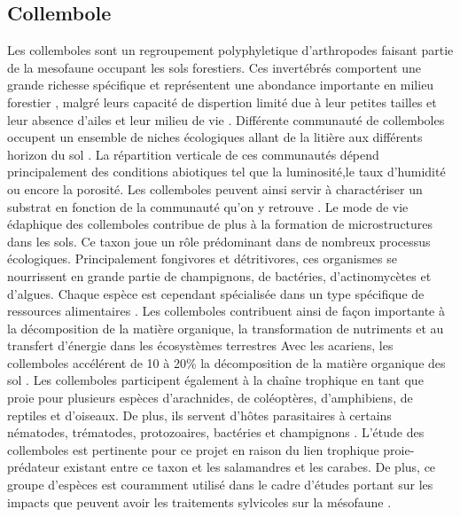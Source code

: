 \subsection*{Collembole}

Les collemboles sont un regroupement polyphyletique d'arthropodes faisant partie de la mesofaune occupant les sols forestiers.
Ces invertébrés comportent une grande richesse spécifique et représentent une abondance importante en milieu forestier \citep{rusekBiodiversityCollembolaTheir1998}, 
malgré leurs capacité de dispertion limité due à leur petites tailles et leur absence d’ailes et leur milieu de vie \citep{Ojala2001Dispersalmicroarthropods}.
Différente communauté de collemboles occupent un ensemble de niches écologiques allant de la litière aux différents horizon du sol \citep{pongeVerticalDistributionCollembola2000}.
La répartition verticale de ces communautés dépend principalement des conditions abiotiques tel que la luminosité,le taux d’humidité ou encore la porosité.
Les collemboles peuvent ainsi servir à charactériser un substrat en fonction de la communauté qu’on y retrouve \citep{rusekBiodiversityCollembolaTheir1998}.
Le mode de vie édaphique des collemboles contribue de plus à la formation de microstructures dans les sols.
Ce taxon joue un rôle prédominant dans de nombreux processus écologiques. 
Principalement fongivores et détritivores, ces organismes se nourrissent en grande partie de champignons, de bactéries, d'actinomycètes et d'algues. 
Chaque espèce est cependant spécialisée dans un type spécifique de ressources alimentaires \citep{Chen1995Foodpreference,rusekBiodiversityCollembolaTheir1998}.
Les collemboles contribuent ainsi de façon importante à la décomposition de la matière organique, la transformation de nutriments et 
au transfert d’énergie dans les écosystèmes terrestres \citep{Cuchta2019importantrole,Hattenschwiler2005Biodiversitylitter,Marsden2020Howagroforestry,Petersen2000Collembolapopulations,rusekBiodiversityCollembolaTheir1998,Wolters1991SoilInvertebrates}
Avec les acariens, les collemboles accélérent de 10 à 20\% la décomposition de la matière organique des sol \citep{Hattenschwiler2005Biodiversitylitter}.
Les collemboles participent également à la chaîne trophique en tant que proie pour plusieurs espèces d’arachnides, de coléoptères, d’amphibiens, 
de reptiles et d’oiseaux. De plus, ils servent d’hôtes parasitaires à certains nématodes, trématodes, protozoaires, bactéries et champignons \citep{rusekBiodiversityCollembolaTheir1998}.
L'étude des collemboles est pertinente pour ce projet en raison du lien trophique proie-prédateur existant entre ce taxon et les salamandres et les carabes. 
De plus, ce groupe d'espèces est couramment utilisé dans le cadre d'études portant sur les impacts que peuvent avoir les traitements sylvicoles sur la mésofaune \citep{farskaManagementIntensityAffects2014,rousseauWoodyBiomassRemoval2019,Salmon2008Relationshipssoil}.

